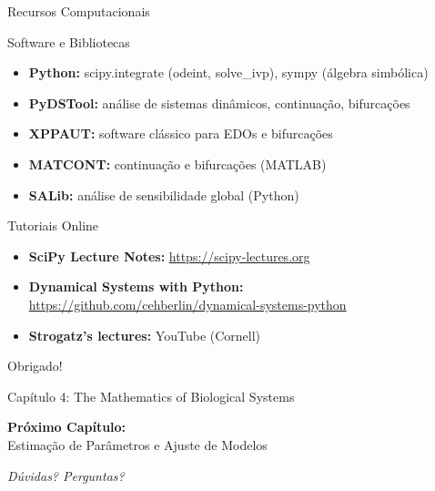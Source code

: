 \begin{frame}[allowframebreaks]{Recursos Computacionais}
\begin{block}{Software e Bibliotecas}
\begin{itemize}
    \item \textbf{Python:} scipy.integrate (odeint, solve\_ivp), sympy (álgebra simbólica)
    \item \textbf{PyDSTool:} análise de sistemas dinâmicos, continuação, bifurcações
    \item \textbf{XPPAUT:} software clássico para EDOs e bifurcações
    \item \textbf{MATCONT:} continuação e bifurcações (MATLAB)
    \item \textbf{SALib:} análise de sensibilidade global (Python)
\end{itemize}
\end{block}

\begin{block}{Tutoriais Online}
\begin{itemize}
    \item \textbf{SciPy Lecture Notes:} \url{https://scipy-lectures.org}
    \item \textbf{Dynamical Systems with Python:} \url{https://github.com/cehberlin/dynamical-systems-python}
    \item \textbf{Strogatz's lectures:} YouTube (Cornell)
\end{itemize}
\end{block}
\end{frame}

\begin{frame}[allowframebreaks]
\begin{center}
{\Huge Obrigado!}

\vspace{1cm}

{\Large Capítulo 4: The Mathematics of Biological Systems}

\vspace{1cm}

\textbf{Próximo Capítulo:}\\
Estimação de Parâmetros e Ajuste de Modelos

\vspace{1cm}

\textit{Dúvidas? Perguntas?}
\end{center}
\end{frame}


